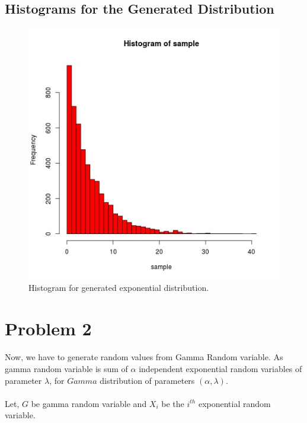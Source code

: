\documentclass{article}
\begin{document}
		\subsection{Histograms for the Generated Distribution}
		\begin{figure}[!hb]
  			\includegraphics[width=\linewidth]{pic/que1_in_R.jpg}
 			 \caption{Histogram for generated exponential distribution. }
			\label{fig:hist1}
		\end{figure}
		
		\pagebreak
		
		
		\section{Problem 2}
		\paragraph{}
			Now, we have to generate random values from Gamma Random variable. As gamma random variable is sum of $\alpha$ independent exponential random variables of parameter $\lambda$, for $Gamma$ distribution of parameters $(\alpha,\lambda)$.
		\paragraph{}
		Let, $G$ be gamma random variable and $X_i$ be the $i^{th}$ exponential random variable.
\end{document}
